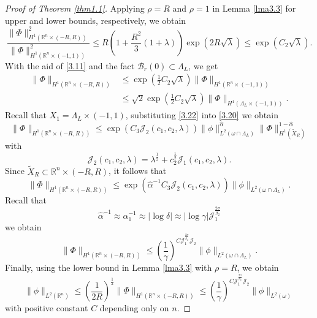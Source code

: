 \documentclass{article}
\numberwithin{equation}{section}
\newcommand\R{\ensuremath{\mathbb{R}}}
\numberwithin{equation}{section}
\theoremstyle{definition}
\begin{document}
\begin{proof}[Proof of Theorem \ref{thm1.1}]
Applying $\rho =R$ and $\rho =1$ in Lemma \ref{lma3.3} for upper and lower bounds, respectively, we obtain
\begin{equation}
	\frac{\|\Phi\|^2_{H^{1}\left( \R^{n}\times (-R,R) \right) }}{\|\Phi\|^2_{H^{1}\left( \R^{n}\times (-1,1) \right) }}\le R \left( 1+\frac{R^2}{3}\left( 1+\lambda \right)  \right) \exp \left( 2 R \sqrt{\lambda}  \right) \le \exp \left( C_2 \sqrt{\lambda}  \right). 
\end{equation}
With the aid of \eqref{3.11} and the fact $\mathcal{B}_r(0)\subset \Lambda_L$, we get
\begin{equation}\label{3.22}
	\begin{aligned}
		\|\Phi\|_{H^{1}\left( \R^{n}\times (-R,R) \right) } &\le \exp\left( \frac{1}{2}C_2 \sqrt{\lambda}  \right) \|\Phi\|_{H^{1}\left( \R^{n}\times (-1,1) \right) }\\
									&\le \sqrt{2} \exp \left( \frac{1}{2}C_2 \sqrt{\lambda}  \right) \|\Phi\|_{H^{1}\left( \Lambda_L\times (-1,1) \right) }.
	\end{aligned} 
\end{equation}
Recall that $X_1=\Lambda_L\times (-1,1)$, substituting \eqref{3.22} into \eqref{3.20} we obtain
\begin{equation}
	\|\Phi\|_{H^{1}\left( \R^{n}\times (-R,R) \right) }\le \exp \left( C_3 \mathcal{J}_2(c_1,c_2,\lambda) \right) \|\phi\|^{\hat{\alpha}}_{L^2\left( \omega \cap \Lambda_L \right) }\|\Phi\|^{1- \hat{\alpha}}_{H^{1}\left( \widetilde{X}_{R} \right) }   
\end{equation}
with
\begin{equation}\label{j.2}
	\mathcal{J}_2(c_1,c_2,\lambda)=\lambda ^{\frac{1}{2}}+c_2^{\frac{1}{2}}\mathcal{J}_1(c_1,c_2,\lambda).
\end{equation}
Since $\widetilde{X}_{R}\subset \R^{n}\times (-R,R)$, it follows that
\begin{equation}
	\|\Phi\|_{H^{1}\left( \R^{n}\times (-R,R) \right) }\le \exp \left( \hat{\alpha}^{-1}C_3\mathcal{J}_2\left( c_1,c_2,\lambda \right)  \right) \|\phi\|_{L^2\left( \omega \cap \Lambda_L \right) }. 
\end{equation}
Recall that
\begin{equation}
\hat{\alpha}^{-1}\approx \alpha^{-1}_1\approx |\log \delta| \approx |\log \gamma|\mathcal{J}_1 ^{\frac{2\sigma }{\beta_2}}
\end{equation}
we obtain
\begin{equation}
	\|\Phi\|_{H^{1}\left( \R^{n}\times (-R,R) \right) }\le \left( \frac{1}{\gamma} \right) ^{C \mathcal{J}_1^{\frac{2\sigma }{ \beta_2}}\mathcal{J}_2}\|\phi\|_{L^2\left( \omega\cap \Lambda_L \right) }.
\end{equation}
Finally, using the lower bound in Lemma \ref{lma3.3} with $\rho =R$, we obtain
\begin{equation}
	\|\phi\|_{L^2(\R^{n})}\le \left( \frac{1}{2 R} \right) ^{\frac{1}{2}}\|\Phi\|_{H^{1}(\R^{n}\times (-R,R))} \le \left( \frac{1}{\gamma} \right) ^{C  \mathcal{J}_1^{\frac{2\sigma }{\beta_2}}\mathcal{J}_2}\|\phi\|_{L^2\left( \omega \right) }
\end{equation}
with positive constant  $C$ depending only on $n$.
\end{proof}
\end{document}
